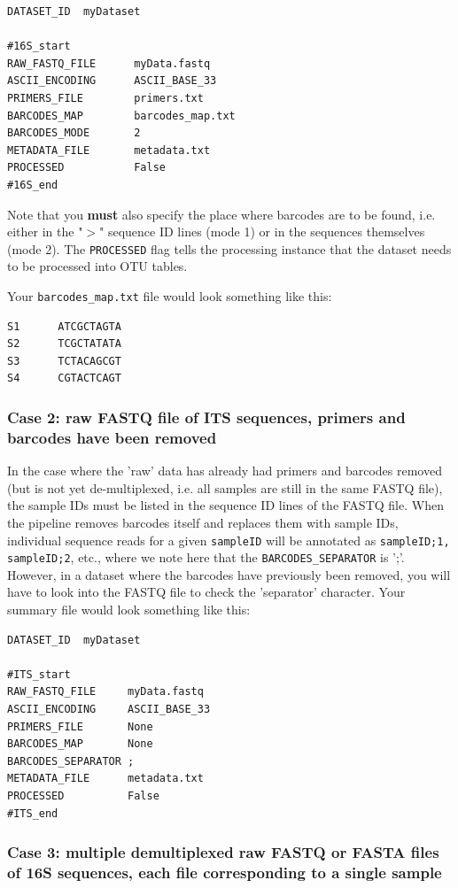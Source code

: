 \documentclass[11pt, oneside]{article}   	%
\begin{document}
\begin{verbatim}
DATASET_ID	myDataset

#16S_start
RAW_FASTQ_FILE      myData.fastq
ASCII_ENCODING      ASCII_BASE_33
PRIMERS_FILE        primers.txt
BARCODES_MAP        barcodes_map.txt
BARCODES_MODE       2
METADATA_FILE       metadata.txt
PROCESSED           False
#16S_end
\end{verbatim}
Note that you \textbf{must} also specify the place where barcodes are to be found, i.e. either in the "$>$" sequence ID lines (mode 1) or in the sequences themselves (mode 2).  The {\tt PROCESSED} flag tells the processing instance that the dataset needs to be processed into OTU tables.

Your {\tt barcodes\_map.txt} file would look something like this:

\begin{verbatim}
S1      ATCGCTAGTA
S2      TCGCTATATA
S3      TCTACAGCGT
S4      CGTACTCAGT
\end{verbatim}

\subsubsection{Case 2: raw FASTQ file of ITS sequences, primers and barcodes have been removed}
In the case where the 'raw' data has already had primers and barcodes removed (but is not yet de-multiplexed, i.e. all samples are still in the same FASTQ file), the sample IDs must be listed in the sequence ID lines of the FASTQ file.  When the pipeline removes barcodes itself and replaces them with sample IDs, individual sequence reads for a given {\tt sampleID} will be annotated as {\tt sampleID;1, sampleID;2}, etc., where we note here that the {\tt BARCODES\_SEPARATOR} is ';'.  However, in a dataset where the barcodes have previously been removed, you will have to look into the FASTQ file to check the 'separator' character.  Your summary file would look something like this:

\begin{verbatim}
DATASET_ID	myDataset

#ITS_start
RAW_FASTQ_FILE     myData.fastq
ASCII_ENCODING     ASCII_BASE_33
PRIMERS_FILE       None
BARCODES_MAP       None
BARCODES_SEPARATOR ;
METADATA_FILE      metadata.txt
PROCESSED          False
#ITS_end
\end{verbatim}
		
\subsubsection{Case 3: multiple demultiplexed raw FASTQ or FASTA files of 16S sequences, each file corresponding to a single sample}
\end{document}
